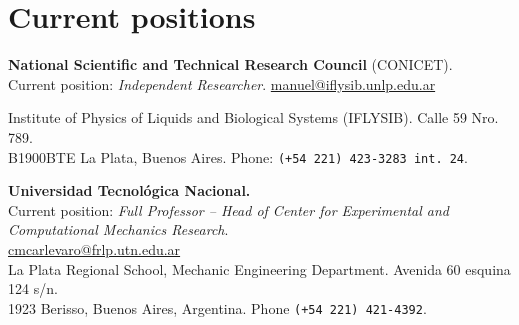 \section*{Current positions}

\begin{timeline}
 \textbf{National Scientific and Technical Research Council} (CONICET). \\Current position: \textit{Independent Researcher}. \faEnvelope[regular]{} \href{mailto:manuel@iflysib.unlp.edu.ar}{manuel@iflysib.unlp.edu.ar}

Institute of Physics of Liquids and Biological Systems (IFLYSIB). Calle 59 Nro. 789.\\ B1900BTE  La Plata, Buenos Aires. Phone: \texttt{(+54 221) 423-3283 int. 24}.

   \textbf{Universidad Tecnológica Nacional.} \\Current position: \textit{Full Professor -- Head of Center for Experimental and Computational Mechanics Research}.\\ \faEnvelope[regular]{} \href{mailto:manuel@iflysib.unlp.edu.ar}{cmcarlevaro@frlp.utn.edu.ar} \\
La Plata Regional School, Mechanic Engineering Department. Avenida 60 esquina 124 s/n. \\1923 Berisso, Buenos Aires, Argentina. Phone \texttt{(+54 221) 421-4392}.
\end{timeline}